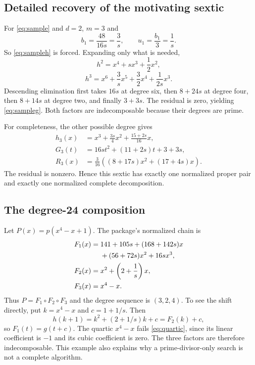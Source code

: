 \documentclass[11pt,a4paper]{article}
\theoremstyle{definition}
\begin{document}
\subsection{Detailed recovery of the motivating sextic}
For \eqref{eq:sample} and $d=2$, $m=3$ and
\[
 b_1=\frac{48}{16s}=\frac{3}{s},\qquad u_1=\frac{b_1}{3}=\frac1s.
\]
So \eqref{eq:sampleh} is forced. Expanding only what is needed,
\[
 h^2=x^4+s x^3+\frac12x^2,
\]
\[
 h^3=x^6+\frac{3}{s}x^5+\frac32x^4+\frac{1}{2s}x^3.
\]
Descending elimination first takes $16s$ at degree six, then $8+24s$ at degree four, then $8+14s$ at degree two, and finally $3+3s$. The residual is zero, yielding \eqref{eq:sampleg}. Both factors are indecomposable because their degrees are prime.

For completeness, the other possible degree gives
\begin{align*}
 h_3(x)&=x^3+\frac{3s}{4}x^2+\frac{15+2s}{16}x,\\
 G_3(t)&=16st^2+(11+2s)t+3+3s,\\
 R_3(x)&=\frac3{16}\left((8+17s)x^2+(17+4s)x\right).
\end{align*}
The residual is nonzero. Hence this sextic has exactly one normalized proper pair and exactly one normalized complete decomposition.

\subsection{The degree-24 composition}
Let $P(x)=p(x^4-x+1)$. The package's normalized chain is
\begin{align*}
 F_1(x)={}&141+105s+(168+142s)x\notag\\
          &+(56+72s)x^2+16sx^3,\\
 F_2(x)={}&x^2+\left(2+\frac1s\right)x,\\
 F_3(x)={}&x^4-x.
\end{align*}
Thus $P=F_1\circ F_2\circ F_3$ and the degree sequence is $(3,2,4)$. To see the shift directly, put $k=x^4-x$ and $c=1+1/s$. Then
\[
 h(k+1)=k^2+(2+1/s)k+c=F_2(k)+c,
\]
so $F_1(t)=g(t+c)$. The quartic $x^4-x$ fails \eqref{eq:quartic}, since its linear coefficient is $-1$ and its cubic coefficient is zero. The three factors are therefore indecomposable. This example also explains why a prime-divisor-only search is not a complete algorithm.
\end{document}
